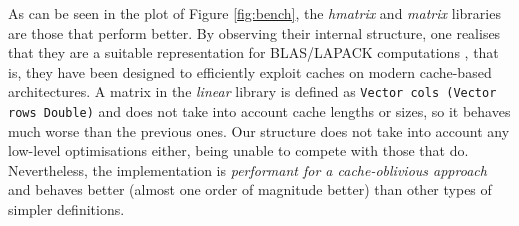 \documentclass[sigplan]{acmart}\settopmatter{}
\newcommand{\hs}{\texttt}
\begin{document}
As can be seen in the plot of Figure \ref{fig:bench}, the \emph{hmatrix} and \emph{matrix} libraries are those that perform better. By observing their internal structure, one realises that they are a suitable representation for BLAS/LAPACK computations \cite{anderson1999lapack}, that is, they have been designed to efficiently exploit caches on modern cache-based architectures. A matrix in the \emph{linear} library is defined as \hs{Vector cols (Vector rows Double)} and does not take into account cache lengths or sizes, so it behaves much worse than the previous ones. Our structure does not take into account any low-level optimisations either, being unable to compete with those that do. Nevertheless, the implementation is \emph{performant for a cache-oblivious approach} and behaves better (almost one order of magnitude better) than other types of simpler definitions.


%
\end{document}
